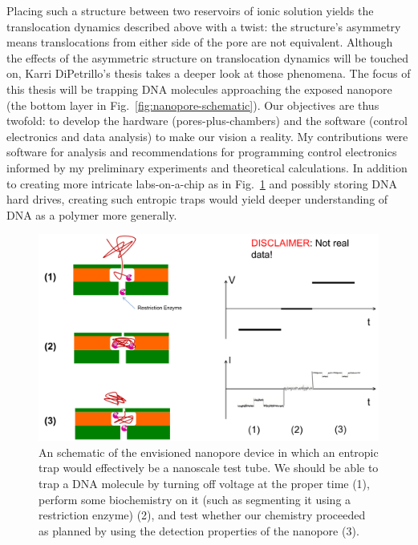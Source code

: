 \documentclass[aps,prl,preprint,groupedaddress]{revtex4}
\begin{document}
Placing such a structure between two reservoirs of ionic solution yields the translocation dynamics described above with a twist: the structure’s asymmetry means translocations from either side of the pore are not equivalent.
Although the effects of the asymmetric structure on translocation dynamics will be touched on, Karri DiPetrillo's thesis takes a deeper look at those phenomena.
The focus of this thesis will be trapping DNA molecules approaching the exposed nanopore (the bottom layer in Fig.~\ref{fig:nanopore-schematic}).
Our objectives are thus twofold: to develop the hardware (pores-plus-chambers) and the software (control electronics and data analysis) to make our vision a reality.
My contributions were software for analysis and recommendations for programming control electronics informed by my preliminary experiments and theoretical calculations.
In addition to creating more intricate labs-on-a-chip as in Fig.~\ref{fig:trapped-and-snipped} and possibly storing DNA hard drives, creating such entropic traps would yield deeper understanding of DNA as a polymer more generally.

\begin{figure}
\centering
\includegraphics[width=1\textwidth]{figures/idealized-trapping}
\caption{An schematic of the envisioned nanopore device in which an entropic trap would effectively be a nanoscale test tube. We should be able to trap a DNA molecule by turning off voltage at the proper time (1), perform some biochemistry on it (such as segmenting it using a restriction enzyme) (2), and test whether our chemistry proceeded as planned by using the detection properties of the nanopore (3).}
\label{fig:trapped-and-snipped}
\end{figure}
\end{document}
